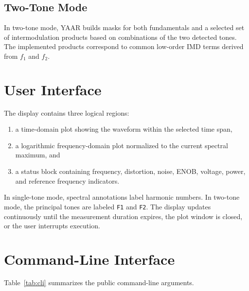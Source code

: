 \documentclass[conference]{IEEEtran}
\begin{document}
\subsection{Two-Tone Mode}
In two-tone mode, YAAR builds masks for both fundamentals and a selected set of intermodulation products based on combinations of the two detected tones. The implemented products correspond to common low-order IMD terms derived from $f_1$ and $f_2$.

\section{User Interface}
The display contains three logical regions:
\begin{enumerate}[leftmargin=*,nosep]
    \item a time-domain plot showing the waveform within the selected time span,
    \item a logarithmic frequency-domain plot normalized to the current spectral maximum, and
    \item a status block containing frequency, distortion, noise, ENOB, voltage, power, and reference frequency indicators.
\end{enumerate}

In single-tone mode, spectral annotations label harmonic numbers. In two-tone mode, the principal tones are labeled \texttt{F1} and \texttt{F2}. The display updates continuously until the measurement duration expires, the plot window is closed, or the user interrupts execution.

\section{Command-Line Interface}
Table~\ref{tab:cli} summarizes the public command-line arguments.
\end{document}
